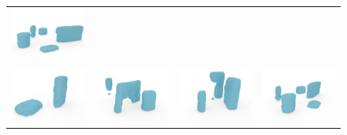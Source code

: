 \documentclass[10pt,twocolumn,letterpaper]{article}
\begin{document}
\begin{figure}
\begin{tabular}{cccc}
    \includegraphics[width=\scenewidth]{scene/cropped/test45_op_0} \\
    \includegraphics[width=\scenewidth]{scene/cropped/learn12_op_1} &
    \includegraphics[width=\scenewidth]{scene/cropped/test11_op_1} &
    \includegraphics[width=\scenewidth]{scene/cropped/learn13_op_1} &
    \includegraphics[width=\scenewidth]{scene/cropped/test45_op_1} \\

\end{tabular}
\end{figure}
\end{document}
